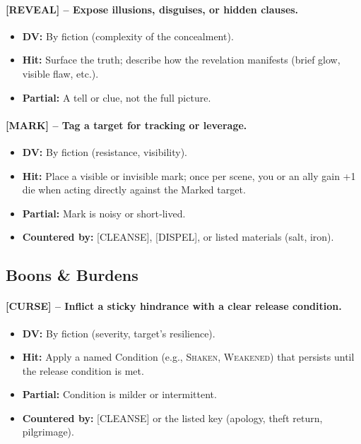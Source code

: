 \paragraph{[REVEAL] – Expose illusions, disguises, or hidden clauses.}
\begin{itemize}
  \item \textbf{DV:} By fiction (complexity of the concealment).
  \item \textbf{Hit:} Surface the truth; describe how the revelation manifests (brief glow, visible flaw, etc.).
  \item \textbf{Partial:} A tell or clue, not the full picture.
\end{itemize}

\paragraph{[MARK] – Tag a target for tracking or leverage.}
\begin{itemize}
  \item \textbf{DV:} By fiction (resistance, visibility).
  \item \textbf{Hit:} Place a visible or invisible mark; once per scene, you or an ally gain +1 die when acting directly against the Marked target.
  \item \textbf{Partial:} Mark is noisy or short‑lived.
  \item \textbf{Countered by:} [CLEANSE], [DISPEL], or listed materials (salt, iron).
\end{itemize}

\subsection{Boons \& Burdens}

\paragraph{[CURSE] – Inflict a sticky hindrance with a clear release condition.}
\begin{itemize}
  \item \textbf{DV:} By fiction (severity, target's resilience).
  \item \textbf{Hit:} Apply a named Condition (e.g., \textsc{Shaken}, \textsc{Weakened}) that persists until the release condition is met.
  \item \textbf{Partial:} Condition is milder or intermittent.
  \item \textbf{Countered by:} [CLEANSE] or the listed key (apology, theft return, pilgrimage).
\end{itemize}


